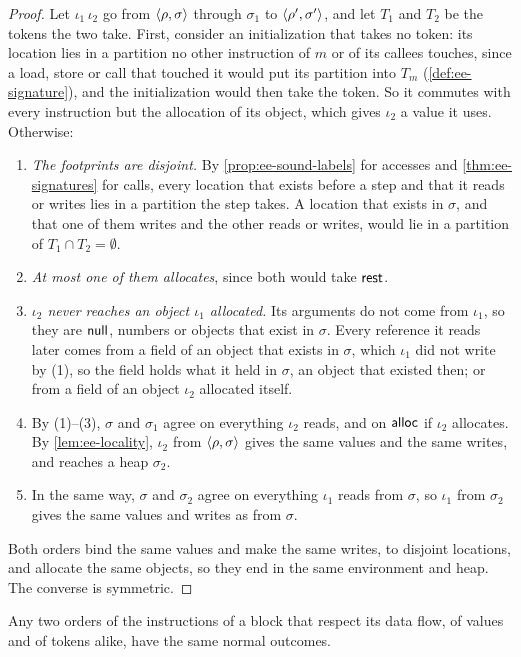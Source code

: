 \begin{proof}
Let $\iota_1\,\iota_2$ go from $\langle \rho, \sigma \rangle$ through $\sigma_1$ to
$\langle \rho', \sigma' \rangle$, and let $T_1$ and $T_2$ be the tokens the two take.
First, consider an initialization that takes no token: its location lies in a
partition no other instruction of $m$ or of its callees touches, since a load,
store or call that touched it would put its partition into $T_m$
(\cref{def:ee-signature}), and the initialization would then take the token. So
it commutes with every instruction but the allocation of its object, which
gives $\iota_2$ a value it uses. Otherwise:
\begin{enumerate}
\item \emph{The footprints are disjoint.} By \cref{prop:ee-sound-labels} for
  accesses and \cref{thm:ee-signatures} for calls, every location that exists
  before a step and that it reads or writes lies in a partition the step takes.
  A location that exists in $\sigma$, and that one of them writes and the other
  reads or writes, would lie in a partition of $T_1 \cap T_2 = \emptyset$.
\item \emph{At most one of them allocates}, since both would take $\mathsf{rest}$.
\item \emph{$\iota_2$ never reaches an object $\iota_1$ allocated.} Its
  arguments do not come from $\iota_1$, so they are $\mathsf{null}$, numbers or objects
  that exist in $\sigma$. Every reference it reads later comes from a field of
  an object that exists in $\sigma$, which $\iota_1$ did not write by (1), so the
  field holds what it held in $\sigma$, an object that existed then; or from a
  field of an object $\iota_2$ allocated itself.
\item By (1)--(3), $\sigma$ and $\sigma_1$ agree on everything $\iota_2$ reads,
  and on $\mathsf{alloc}$ if $\iota_2$ allocates. By \cref{lem:ee-locality}, $\iota_2$
  from $\langle \rho, \sigma \rangle$ gives the same values and the same writes, and
  reaches a heap $\sigma_2$.
\item In the same way, $\sigma$ and $\sigma_2$ agree on everything $\iota_1$
  reads from $\sigma$, so $\iota_1$ from $\sigma_2$ gives the same values and
  writes as from $\sigma$.
\end{enumerate}
Both orders bind the same values and make the same writes, to disjoint
locations, and allocate the same objects, so they end in the same environment
and heap. The converse is symmetric.
\end{proof}

\begin{corollary}\label{cor:ee-any-order}
Any two orders of the instructions of a block that respect its data flow, of
values and of tokens alike, have the same normal outcomes.
\end{corollary}

